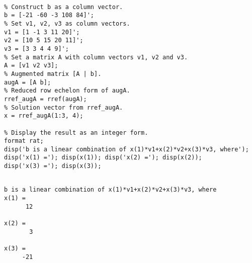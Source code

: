 \begin{sol}
\begin{verbatim}

% Construct b as a column vector.
b = [-21 -60 -3 108 84]';
% Set v1, v2, v3 as column vectors. 
v1 = [1 -1 3 11 20]'; 
v2 = [10 5 15 20 11]'; 
v3 = [3 3 4 4 9]';
% Set a matrix A with column vectors v1, v2 and v3. 
A = [v1 v2 v3]; 
% Augmented matrix [A | b].
augA = [A b]; 
% Reduced row echelon form of augA.
rref_augA = rref(augA);
% Solution vector from rref_augA. 
x = rref_augA(1:3, 4); 

% Display the result as an integer form.
format rat; 
disp('b is a linear combination of x(1)*v1+x(2)*v2+x(3)*v3, where');
disp('x(1) ='); disp(x(1)); disp('x(2) ='); disp(x(2));
disp('x(3) ='); disp(x(3));
\end{verbatim}

\begin{outputs}

\begin{verbatim}

b is a linear combination of x(1)*v1+x(2)*v2+x(3)*v3, where
x(1) =
      12

x(2) =
       3

x(3) =
     -21
\end{verbatim}
\end{outputs}
\end{sol}